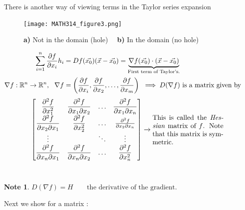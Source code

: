 \documentclass[
	12pt,
	]{article}
\newcommand{\Rn}{\mathbb{R}^{n}}
\theoremstyle{custom}
\theoremstyle{custom}
\theoremstyle{custom}
\theoremstyle{custom}
\theoremstyle{custom}
\theoremstyle{definition}
\theoremstyle{example}
\newtheorem*{note}{Note}
\theoremstyle{note}
\theoremstyle{remark}
\theoremstyle{example}
\newcounter{theo}[section]\setcounter{theo}{0}
\numberwithin{equation}{subsection}
\begin{document}
  			   			 \noindent There is another way of viewing terms in the Taylor series expansion
  			 
  			 \begin{figure}[H]
  			 	\centering
			   			   			 	\texttt{[image: MATH314\_figure3.png]}
			   			   			 	\captionsetup{margin=1cm, justification=raggedright}\caption{\textbf{a)} Not in the domain (hole) \ \  \textbf{b)} In the domain (no hole)}
	   			   			 \end{figure}
	   		 
	   		 \noindent  
	   		 \begin{align*}
	   		 	\sum_{i=1}^{n} \pdv{f}{x_{i}} (\vec{x_{0}}) h_{i} &= D{f} (\vec{x_{0}})(\vec{x} - \vec{x_{0}}) 
	   		 	=\underbrace{\nabla f(\vec{x_{0}}) \cdot (\vec{x } - \vec{x_{0}})}_{\text{First term of Taylor's.}} \\
	   		 	\nabla f: \Rn \to \Rn , \ \ \nabla f &= \left(\pdv{f}{x_{i}},\pdv{f}{x_{2}}, \dots, \pdv{f}{x_{m}}\right) \
	   		 	\implies D(\nabla f) \ \text{is a matrix given by }&
	   		 \end{align*}
	   		 \begin{equation*}
	   		 \begin{split}
	   		 		\begin{bmatrix}
	   		 			\dfrac{\partial^{2}f}{\partial x_{1}^{2}} & \dfrac{\partial^{2}f}{\partial x_{1}\partial x_{2}} &\dots & \dfrac{\partial^{2} f}{\partial x_{1} \partial x_{n}} \\
	   		 			\dfrac{\partial^{2}f}{\partial x_{2} \partial x_{1}} & \dfrac{\partial^{2}f}{\partial x_{2}^{2}} &\dots &\frac{\partial^{2} f}{\partial x_{2} \partial x_{n}} \\
	   		 			\vdots&  &\ddots &\vdots \\
	   		 			\dfrac{\partial^{2}f}{\partial x_{n} \partial x_{1}} & \dfrac{\partial^{2} f}{\partial x_{n} \partial x_{2}} & \dots & \dfrac{\partial^{2} f}{\partial x_{n}^{2}}
	   		 		\end{bmatrix}
	   		 \end{split} \xrightarrow{} \parbox[r]{0.3\linewidth}{This is called the \textit{Hessian} matrix of $f$. Note that this matrix is symmetric.}
	   		 \end{equation*}
	   		 \\
	   		 \begin{note} $D(\nabla f) = H \qquad \text{the derivative of the gradient}.$
	   		 \end{note}
	   		 \noindent Next we show for a matrix :
\end{document}
